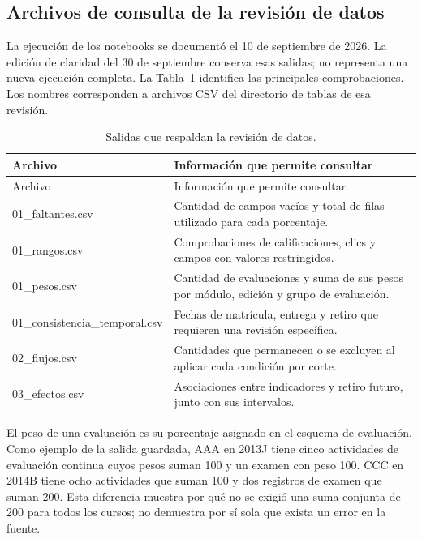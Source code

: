 \subsection{Archivos de consulta de la revisión de datos}\label{kami:archivos}
La ejecución de los notebooks se documentó el 10 de septiembre de 2026. La edición de claridad del 30 de septiembre conserva esas salidas; no representa una nueva ejecución completa. La Tabla~\ref{kami:salidas} identifica las principales comprobaciones. Los nombres corresponden a archivos CSV del directorio de tablas de esa revisión.
\begingroup\small\setlength{\tabcolsep}{4pt}\renewcommand{\arraystretch}{1.16}
\begin{longtable}{p{.43\linewidth}p{.49\linewidth}}
\caption{Salidas que respaldan la revisión de datos.}\label{kami:salidas}\\
\toprule Archivo & Información que permite consultar \\\midrule\endfirsthead
\toprule Archivo & Información que permite consultar \\\midrule\endhead
\bottomrule\endfoot
\textnormal{01\_faltantes.csv} & Cantidad de campos vacíos y total de filas utilizado para cada porcentaje.\\
\textnormal{01\_rangos.csv} & Comprobaciones de calificaciones, clics y campos con valores restringidos.\\
\textnormal{01\_pesos.csv} & Cantidad de evaluaciones y suma de sus pesos por módulo, edición y grupo de evaluación.\\
\textnormal{01\_consistencia\_temporal.csv} & Fechas de matrícula, entrega y retiro que requieren una revisión específica.\\
\textnormal{02\_flujos.csv} & Cantidades que permanecen o se excluyen al aplicar cada condición por corte.\\
\textnormal{03\_efectos.csv} & Asociaciones entre indicadores y retiro futuro, junto con sus intervalos.\\
\end{longtable}\endgroup
El peso de una evaluación es su porcentaje asignado en el esquema de evaluación. Como ejemplo de la salida guardada, AAA en 2013J tiene cinco actividades de evaluación continua cuyos pesos suman 100 y un examen con peso 100. CCC en 2014B tiene ocho actividades que suman 100 y dos registros de examen que suman 200. Esta diferencia muestra por qué no se exigió una suma conjunta de 200 para todos los cursos; no demuestra por sí sola que exista un error en la fuente.


